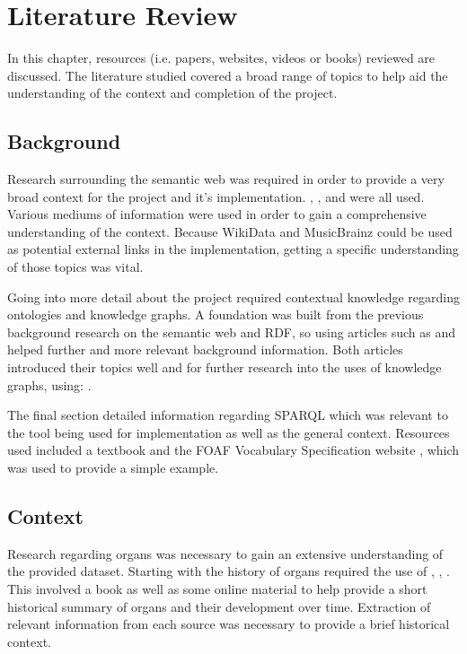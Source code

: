 \chapter{Literature Review}
In this chapter, resources (i.e. papers, websites, videos or books) reviewed are discussed. The literature studied covered a broad range of topics to help aid the understanding of the context and completion of the project.

\section{Background}
\hspace{0.5cm} Research surrounding the semantic web was required in order to provide a very broad context for the project and it's implementation. \cite{berners-TBLBook}, \cite{semanticweb}, \cite{rdf} and \cite{TTL} were all used. Various mediums of information were used in order to gain a comprehensive understanding of the context. Because WikiData \cite{wikidata} and MusicBrainz \cite{musicbrainz} could be used as potential external links in the implementation, getting a specific understanding of those topics was vital. 

Going into more detail about the project required contextual knowledge regarding ontologies and knowledge graphs. A foundation was built from the previous background research on the semantic web and RDF, so using articles such as \cite{ontology} and \cite{knowledgegraph} helped further and more relevant background information. Both articles introduced their topics well and for further research into the uses of knowledge graphs, using: \cite{searchengine}.   

The final section detailed information regarding SPARQL which was relevant to the tool being used for implementation as well as the general context. Resources used included a textbook\cite{sparlbook} and the FOAF Vocabulary Specification website \cite{foaf}, which was used to provide a simple example. 

\section{Context}
\hspace{0.5cm} Research regarding organs was necessary to gain an extensive understanding of the provided dataset. Starting with the history of organs required the use of \cite{organhistory}, \cite{organhistory1}, \cite{organmedivalhistory}. This involved a book as well as some online material to help provide a short historical summary of organs and their development over time. Extraction of relevant information from each source was necessary to provide a brief historical context. 

